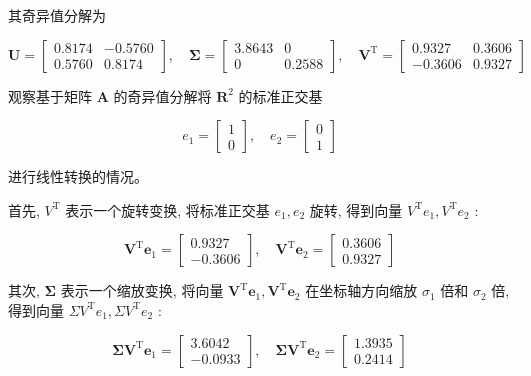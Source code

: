\documentclass[10pt]{article}
\begin{document}
其奇异值分解为

$$
\boldsymbol{U}=\left[\begin{array}{ll}
0.8174 & -0.5760 \\
0.5760 & 0.8174
\end{array}\right], \quad \boldsymbol{\Sigma}=\left[\begin{array}{ll}
3.8643 & 0 \\
0 & 0.2588
\end{array}\right], \quad \boldsymbol{V}^{\mathrm{T}}=\left[\begin{array}{rr}
0.9327 & 0.3606 \\
-0.3606 & 0.9327
\end{array}\right]
$$

观察基于矩阵 $\boldsymbol{A}$ 的奇异值分解将 $\boldsymbol{R}^{2}$ 的标准正交基

$$
e_{1}=\left[\begin{array}{l}
1 \\
0
\end{array}\right], \quad e_{2}=\left[\begin{array}{l}
0 \\
1
\end{array}\right]
$$

进行线性转换的情况。

首先, $V^{\mathrm{T}}$ 表示一个旋转变换, 将标准正交基 $e_{1}, e_{2}$ 旋转, 得到向量 $V^{\mathrm{T}} e_{1}, V^{\mathrm{T}} e_{2}$ :

$$
\boldsymbol{V}^{\mathrm{T}} \boldsymbol{e}_{1}=\left[\begin{array}{r}
0.9327 \\
-0.3606
\end{array}\right], \quad \boldsymbol{V}^{\mathrm{T}} \boldsymbol{e}_{2}=\left[\begin{array}{l}
0.3606 \\
0.9327
\end{array}\right]
$$

其次, $\boldsymbol{\Sigma}$ 表示一个缩放变换, 将向量 $\boldsymbol{V}^{\mathrm{T}} \boldsymbol{e}_{1}, \boldsymbol{V}^{\mathrm{T}} \boldsymbol{e}_{2}$ 在坐标轴方向缩放 $\sigma_{1}$ 倍和 $\sigma_{2}$ 倍, 得到向量 $\Sigma V^{\mathrm{T}} e_{1}, \Sigma V^{\mathrm{T}} e_{2}$ :

$$
\boldsymbol{\Sigma} \boldsymbol{V}^{\mathrm{T}} \boldsymbol{e}_{1}=\left[\begin{array}{r}
3.6042 \\
-0.0933
\end{array}\right], \quad \boldsymbol{\Sigma} \boldsymbol{V}^{\mathrm{T}} \boldsymbol{e}_{2}=\left[\begin{array}{l}
1.3935 \\
0.2414
\end{array}\right]
$$
\end{document}
